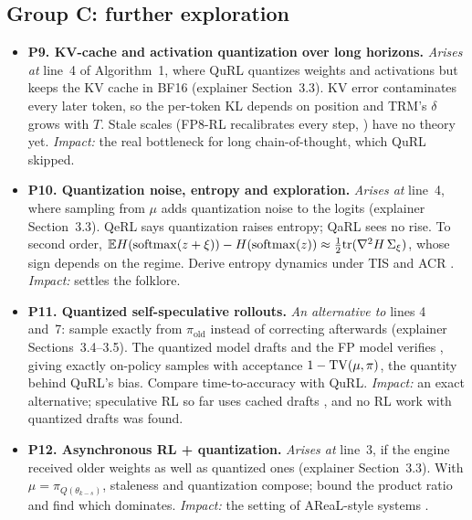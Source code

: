 \documentclass[11pt]{article}
\begin{document}
\subsection{Group C: further exploration}
\begin{itemize}
\item \textbf{P9. KV-cache and activation quantization over long horizons.} \emph{Arises at} line~4 of Algorithm~1, where QuRL quantizes weights and activations but keeps the KV cache in BF16 (explainer Section~3.3). KV error contaminates every later token, so the per-token KL depends on position and TRM's $\delta$ grows with $T$. Stale scales (FP8-RL recalibrates every step, \citealp{qiu2026fp8rl}) have no theory yet. \emph{Impact:} the real bottleneck for long chain-of-thought, which QuRL skipped.
\item \textbf{P10. Quantization noise, entropy and exploration.} \emph{Arises at} line~4, where sampling from $\mu$ adds quantization noise to the logits (explainer Section~3.3). QeRL says quantization raises entropy; QaRL sees no rise. To second order, $\mathbb{E} H(\mathrm{softmax}(z+\xi))-H(\mathrm{softmax}(z))\approx\tfrac12\mathrm{tr}(\nabla^2H\,\Sigma_\xi)$, whose sign depends on the regime. Derive entropy dynamics under TIS and ACR \citep[cf.][]{cui2025entropy}. \emph{Impact:} settles the folklore.
\item \textbf{P11. Quantized self-speculative rollouts.} \emph{An alternative to} lines 4 and~7: sample exactly from $\pi_{\mathrm{old}}$ instead of correcting afterwards (explainer Sections~3.4--3.5). The quantized model drafts and the FP model verifies \citep{leviathan2023speculative,chen2023speculative}, giving exactly on-policy samples with acceptance $1-\mathrm{TV}(\mu,\pi)$, the quantity behind QuRL's bias. Compare time-to-accuracy with QuRL. \emph{Impact:} an exact alternative; speculative RL so far uses cached drafts \citep{liu2025specrl,chang2026srt}, and no RL work with quantized drafts was found.
\item \textbf{P12. Asynchronous RL + quantization.} \emph{Arises at} line~3, if the engine received older weights as well as quantized ones (explainer Section~3.3). With $\mu=\pi_{Q(\theta_{k-s})}$, staleness and quantization compose; bound the product ratio and find which dominates. \emph{Impact:} the setting of AReaL-style systems \citep{fu2025areal}.
\end{itemize}

\end{document}
